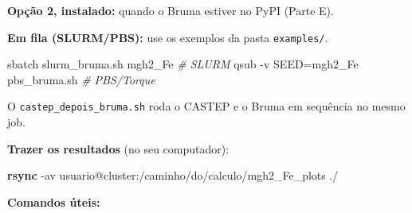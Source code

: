 \documentclass[
  10pt,
]{article}
\newenvironment{Shaded}{\begin{snugshade}}{\end{snugshade}}
\newcommand{\AttributeTok}[1]{\textcolor[rgb]{0.13,0.29,0.53}{#1}}
\newcommand{\BuiltInTok}[1]{#1}
\newcommand{\CommentTok}[1]{\textcolor[rgb]{0.56,0.35,0.01}{\textit{#1}}}
\newcommand{\ExtensionTok}[1]{#1}
\newcommand{\FunctionTok}[1]{\textcolor[rgb]{0.13,0.29,0.53}{\textbf{#1}}}
\newcommand{\NormalTok}[1]{#1}
\newcommand{\OperatorTok}[1]{\textcolor[rgb]{0.81,0.36,0.00}{\textbf{#1}}}
\newcommand{\StringTok}[1]{\textcolor[rgb]{0.31,0.60,0.02}{#1}}
\newcommand{\VariableTok}[1]{\textcolor[rgb]{0.00,0.00,0.00}{#1}}
\begin{document}
\textbf{Opção 2, instalado:} quando o Bruma estiver no PyPI (Parte E).

\begin{Shaded}
\end{Shaded}

\textbf{Em fila (SLURM/PBS):} use os exemplos da pasta
\texttt{examples/\allowbreak{}}.

\begin{Shaded}
\begin{Highlighting}[]
\ExtensionTok{sbatch}\NormalTok{ slurm\_bruma.sh mgh2\_Fe                    }\CommentTok{\# SLURM}
\ExtensionTok{qsub} \AttributeTok{{-}v}\NormalTok{ SEED=mgh2\_Fe pbs\_bruma.sh                }\CommentTok{\# PBS/Torque}
\end{Highlighting}
\end{Shaded}

O
\texttt{castep\_\allowbreak{}depois\_\allowbreak{}bruma.\allowbreak{}sh}
roda o CASTEP e o Bruma em sequência no mesmo job.

\textbf{Trazer os resultados} (no seu computador):

\begin{Shaded}
\begin{Highlighting}[]
\FunctionTok{rsync} \AttributeTok{{-}av}\NormalTok{ usuario@cluster:/caminho/do/calculo/mgh2\_Fe\_plots ./}
\end{Highlighting}
\end{Shaded}

\textbf{Comandos úteis:}
\end{document}
